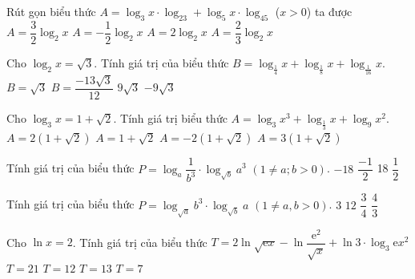 \begin{ex}%
	Rút gọn biểu thức $A=\log_3x\cdot\log_23+\log_5x\cdot\log_45$ ($x>0$) ta được 
	\choice
	{\True $A=\dfrac{3}{2}\log_2x$}
	{$A=-\dfrac{1}{2}\log_2x$}
	{$A=2\log_2x$}
	{$A=\dfrac{2}{3}\log_2x$}
\end{ex}

\begin{ex}%
	Cho $\log_2x=\sqrt{3}$. Tính giá trị của biểu thức $B=\log_{\tfrac{1}{4}}x+\log_{\tfrac{1}{8}}x+\log_{\tfrac{1}{16}}x$.
	\choice
	{$B=\sqrt{3}$}
	{\True $B=\dfrac{-13\sqrt{3}}{12}$}
	{$9\sqrt{3}$}
	{$-9\sqrt{3}$}
\end{ex}

\begin{ex}%
	Cho $\log_3x=1+\sqrt{2}$. Tính giá trị biểu thức $A=\log_3x^3+\log_{\tfrac{1}{3}}x+\log_9x^2$.
	\choice
	{$A=2(1+\sqrt{2})$}
	{$A=1+\sqrt{2}$}
	{$A=-2(1+\sqrt{2})$}
	{\True $A=3(1+\sqrt{2})$}
\end{ex}

\begin{ex}%
	Tính giá trị của biểu thức $P=\log_a\dfrac{1}{b^3}\cdot\log_{\sqrt{b}}a^3$ $\left(1\neq a;b>0\right)$.
	\choice
	{\True $-18$}
	{$\dfrac{-1}{2}$}
	{18}
	{$\dfrac{1}{2}$}
\end{ex}

\begin{ex}%
	Tính giá trị của biểu thức $P=\log_{\sqrt{a}}b^3\cdot\log_{\sqrt{b}}a$ $\left(1\neq a,b>0\right)$.
	\choice
	{$3$}
	{\True $12$}
	{$\dfrac{3}{4}$}
	{$\dfrac{4}{3}$}
\end{ex}

\begin{ex}%
	Cho $\ln x=2$. Tính giá trị của biểu thức $T=2\ln \sqrt{\mathrm{e}x}-\ln \dfrac{\mathrm{e}^2}{\sqrt{x}}+\ln 3\cdot\log_3\mathrm{e}x^2$ 
	\choice
	{$T=21$}
	{$T=12$}
	{$T=13$}
	{\True $T=7$}
\end{ex}

